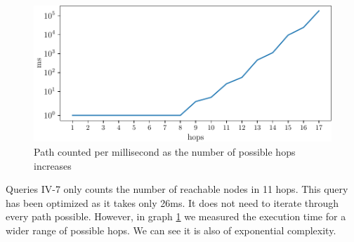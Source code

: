 \documentclass[a4paper, 12pt]{article}
\begin{document}
\begin{figure}
\centering
\includegraphics[scale=0.8]{graphtime4}
	\caption{Path counted per millisecond as the number of possible hops increases}
	\label{topkek3}
\end{figure}

Queries IV-7 only counts the number of reachable nodes in 11 hops. This query has been optimized as it takes only 26ms. It does not need to iterate through every path possible. However, in graph \ref{topkek3} we measured the execution time for a wider range of possible hops. We can see it is also of exponential complexity.
\end{document}
